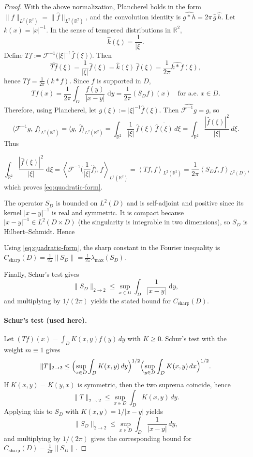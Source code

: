 \documentclass{amsart}
\newcommand{\R}{\mathbb{R}}
\newcommand{\dd}{\,\mathrm{d}}
\newcommand{\ip}[2]{\left\langle #1,#2\right\rangle}
\theoremstyle{plain}
\theoremstyle{remark}
\begin{document}
\begin{proof}
With the above normalization, Plancherel holds in the form
$\|f\|_{L^2(\R^2)}=\|\widehat f\|_{L^2(\R^2)}$, and the convolution identity is
$\widehat{g*h}=2\pi\,\widehat g\,\widehat h$.
Let $k(x)=|x|^{-1}$. In the sense of tempered distributions in $\R^2$,
\[
\widehat k(\xi)=\frac{1}{|\xi|}.
\]
Define $T f := \mathcal F^{-1}\!\big(|\xi|^{-1}\widehat f(\xi)\big)$. Then
\[
\widehat{Tf}(\xi)=\frac{1}{|\xi|}\widehat f(\xi)
=\widehat k(\xi)\,\widehat f(\xi)
=\frac{1}{2\pi}\widehat{k*f}(\xi),
\]
hence $Tf=\frac{1}{2\pi}(k*f)$. Since $f$ is supported in $D$,
\[
Tf(x)=\frac{1}{2\pi}\int_D\frac{f(y)}{|x-y|}\,\dd y=\frac{1}{2\pi}(S_D f)(x)
\quad\text{for a.e. }x\in D.
\]
Therefore, using Plancherel, let $g(\xi):=|\xi|^{-1}\widehat f(\xi)$. Then $\widehat{\mathcal F^{-1}g}=g$, so
\[
\big\langle \mathcal F^{-1}g,\,f\big\rangle_{L^2(\R^2)}
=\big\langle g,\,\widehat f\big\rangle_{L^2(\R^2)}
=\int_{\R^2}\frac{1}{|\xi|}\,\widehat f(\xi)\,\overline{\widehat f(\xi)}\,d\xi
=\int_{\R^2}\frac{|\widehat f(\xi)|^2}{|\xi|}\,d\xi.
\]
Thus

\[
\int_{\R^2}\frac{|\widehat f(\xi)|^2}{|\xi|}\,\dd\xi
=\ip{\mathcal F^{-1}\!\Big(\frac{1}{|\xi|}\widehat f\Big)}{f}_{L^2(\R^2)}
=\ip{Tf}{f}_{L^2(\R^2)}
=\frac{1}{2\pi}\ip{S_D f}{f}_{L^2(D)},
\]
which proves \eqref{eq:quadratic-form}.

The operator $S_D$ is bounded on $L^2(D)$ and is self-adjoint and positive since
its kernel $|x-y|^{-1}$ is real and symmetric. It is compact because
$|x-y|^{-1}\in L^2(D\times D)$ (the singularity is integrable in two dimensions),
so $S_D$ is Hilbert--Schmidt. Hence

Using \eqref{eq:quadratic-form}, the sharp constant in the Fourier inequality is
$C_{\mathrm{sharp}}(D)=\frac{1}{2\pi}\|S_D\|=\frac{1}{2\pi}\lambda_{\max}(S_D)$.

Finally, Schur's test gives
\[
\|S_D\|_{2\to2}\le \sup_{x\in D}\int_D\frac{1}{|x-y|}\,\dd y,
\]
and multiplying by $1/(2\pi)$ yields the stated bound for $C_{\mathrm{sharp}}(D)$. \paragraph{Schur's test (used here).}
Let $(Tf)(x)=\int_D K(x,y)f(y)\,dy$ with $K\ge 0$. Schur's test with the weight $m\equiv 1$ gives
\[
\|T\|_{2\to 2}\le
\Bigl(\sup_{x\in D}\int_D K(x,y)\,dy\Bigr)^{1/2}
\Bigl(\sup_{y\in D}\int_D K(x,y)\,dx\Bigr)^{1/2}.
\]
If $K(x,y)=K(y,x)$ is symmetric, then the two suprema coincide, hence
\[
\|T\|_{2\to 2}\le \sup_{x\in D}\int_D K(x,y)\,dy.
\]
Applying this to $S_D$ with $K(x,y)=1/|x-y|$ yields
\[
\|S_D\|_{2\to 2}\le \sup_{x\in D}\int_D\frac{1}{|x-y|}\,dy,
\]
and multiplying by $1/(2\pi)$ gives the corresponding bound for
$C_{\mathrm{sharp}}(D)=\frac{1}{2\pi}\|S_D\|.$
\end{proof}
\end{document}

